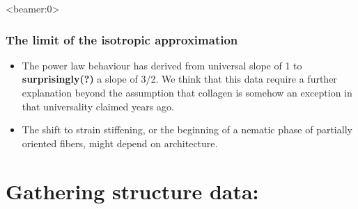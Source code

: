 \documentclass[9pt]{beamer}
\begin{document}
\begin{frame}<beamer:0>
  \frametitle{The limit of the isotropic approximation}
  \begin{itemize}
    \item The power law behaviour has derived from universal slope of 1 \cite{mackintosh_bill} to \textbf{surprisingly(?)} a slope of  3/2. We think that this data require a further explanation beyond the assumption that collagen is somehow an exception in that universality claimed years ago.
    \item The shift to strain stiffening, or the beginning of a nematic phase of partially oriented fibers, might depend on architecture.
  \end{itemize}
\end{frame}
%

\section{Gathering structure data:}
\end{document}
